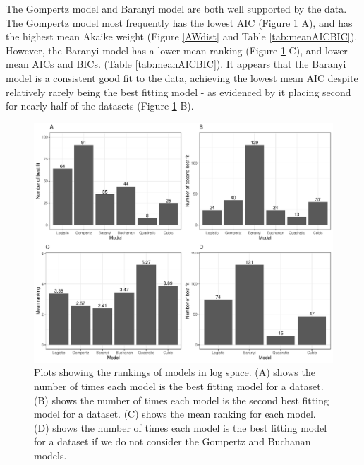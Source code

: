 \documentclass[11pt, a4paper]{article}
\begin{document}
\begin{linenumbers}
The Gompertz model and Baranyi model are both well supported by the data. The Gompertz model most frequently has the lowest AIC (Figure \ref{fig:bestbars} A), and has the highest mean Akaike weight (Figure \ref{AWdist} and Table \ref{tab:meanAICBIC}). However, the Baranyi model has a lower mean ranking (Figure \ref{fig:bestbars} C), and lower mean AICs and BICs. (Table \ref{tab:meanAICBIC}). It appears that the Baranyi model is a consistent good fit to the data, achieving the lowest mean AIC despite relatively rarely being the best fitting model - as evidenced by it placing second for nearly half of the datasets (Figure \ref{fig:bestbars} B).



        \begin{figure}[H]
        \includegraphics[width=\linewidth]{../results/best_fit_frequency_bar.pdf}
        \caption{Plots showing the rankings of models in log space. (A) shows the number of times each model is the best fitting model for a dataset. (B) shows the number of times each model is the second best fitting model for a dataset. (C) shows the mean ranking for each model. (D) shows the number of times each model is the best fitting model for a dataset if we do not consider the Gompertz and Buchanan models. }
        \label{fig:bestbars}
        \end{figure}
        

\end{linenumbers}
\end{document}

